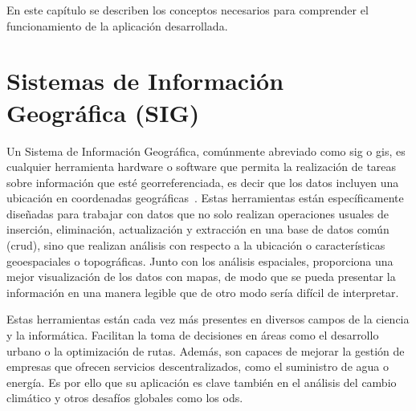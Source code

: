 
En este capítulo se describen los conceptos necesarios para comprender el funcionamiento de la aplicación desarrollada.

\section{Sistemas de Información Geográfica (SIG)}
	Un Sistema de Información Geográfica, comúnmente abreviado como \acrshort{sig} o \acrshort{gis}, es cualquier herramienta hardware o software que permita la realización de tareas sobre información que esté georreferenciada, es decir que los datos incluyen una ubicación en coordenadas geográficas~\cite{qgis_introduction_gis}.
	Estas herramientas están específicamente diseñadas para trabajar con datos que no solo realizan operaciones usuales de inserción, eliminación, actualización y extracción en una base de datos común (\acrshort{crud}), sino que realizan análisis con respecto a la ubicación o características geoespaciales o topográficas. Junto con los análisis espaciales, proporciona una mejor visualización de los datos con mapas, de modo que se pueda presentar la información en una manera legible que de otro modo sería difícil de interpretar.

	Estas herramientas están cada vez más presentes en diversos campos de la ciencia y la informática. Facilitan la toma de decisiones en áreas como el desarrollo urbano o la optimización de rutas. Además, son capaces de mejorar la gestión de empresas que ofrecen servicios descentralizados, como el suministro de agua o energía. Es por ello que su aplicación es clave también en el análisis del cambio climático y otros desafíos globales como los \acrlong{ods}.

